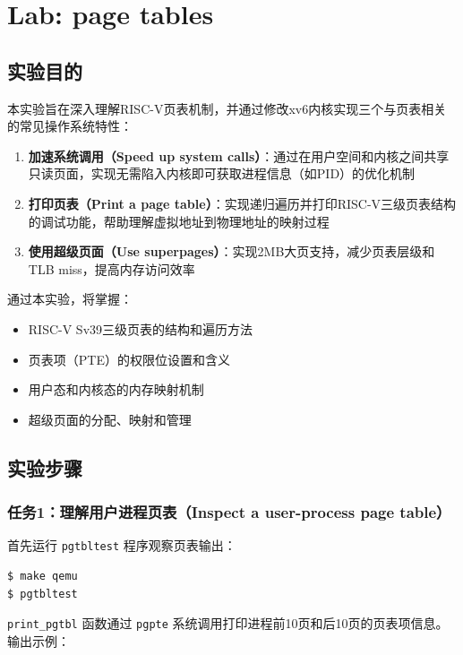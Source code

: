 \section{Lab: page tables}

\subsection{实验目的}

本实验旨在深入理解RISC-V页表机制，并通过修改xv6内核实现三个与页表相关的常见操作系统特性：

\begin{enumerate}
    \item \textbf{加速系统调用（Speed up system calls）}：通过在用户空间和内核之间共享只读页面，实现无需陷入内核即可获取进程信息（如PID）的优化机制
    \item \textbf{打印页表（Print a page table）}：实现递归遍历并打印RISC-V三级页表结构的调试功能，帮助理解虚拟地址到物理地址的映射过程
    \item \textbf{使用超级页面（Use superpages）}：实现2MB大页支持，减少页表层级和TLB miss，提高内存访问效率
\end{enumerate}

通过本实验，将掌握：
\begin{itemize}
    \item RISC-V Sv39三级页表的结构和遍历方法
    \item 页表项（PTE）的权限位设置和含义
    \item 用户态和内核态的内存映射机制
    \item 超级页面的分配、映射和管理
\end{itemize}

\subsection{实验步骤}

\subsubsection{任务1：理解用户进程页表（Inspect a user-process page table）}

首先运行 \texttt{pgtbltest} 程序观察页表输出：

\begin{lstlisting}[language=bash]
$ make qemu
$ pgtbltest
\end{lstlisting}

\texttt{print\_pgtbl} 函数通过 \texttt{pgpte} 系统调用打印进程前10页和后10页的页表项信息。输出示例：


